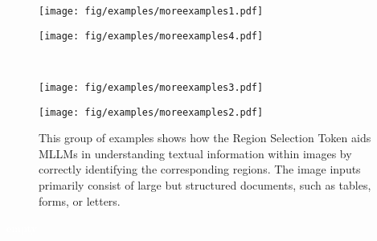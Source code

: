 \begin{figure*}[h]
  \centering
    \begin{minipage}[t]{0.45\textwidth}
        \centering
        \vspace{0pt}
        \texttt{[image: fig/examples/moreexamples1.pdf]}
    \end{minipage}
    \hfill
    \begin{minipage}[t]{0.45\textwidth}
        \centering
        \vspace{0pt}
        \texttt{[image: fig/examples/moreexamples4.pdf]}
    \end{minipage}
    \\
    \begin{minipage}[t]{0.45\textwidth}
        \centering
        \vspace{0pt}
        \texttt{[image: fig/examples/moreexamples3.pdf]}
    \end{minipage}
    \hfill
    \begin{minipage}[t]{0.45\textwidth}
        \centering
        \vspace{0pt}
        \texttt{[image: fig/examples/moreexamples2.pdf]}
    \end{minipage}
   \caption{This group of examples shows how the Region Selection Token aids MLLMs in understanding textual information within images by correctly identifying the corresponding regions. The image inputs primarily consist of large but structured documents, such as tables, forms, or letters.}
   \label{fig:moreexample:g1}
\end{figure*}
\textcolor{white}{empty}